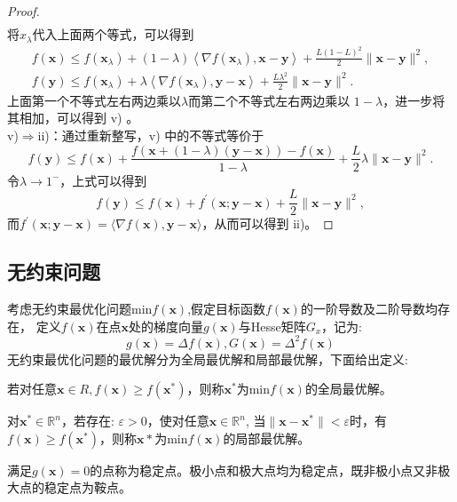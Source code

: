 \begin{proof}
\begin{equation}
\begin{array}{l}
\end{array}
    \nonumber
\end{equation}
将$x_{\lambda}  $代入上面两个等式，可以得到
\begin{equation}
\begin{array}{c}
f(\bm{x}) \leq f\left(\bm{x}_{\lambda}\right)+(1-\lambda)\left\langle\nabla f\left(\bm{x}_{\lambda}\right), \bm{x}-\bm{y}\right\rangle+\frac{L(1-L)^{2}}{2}\|\bm{x}-\bm{y}\|^{2} , \\
f(\bm{y}) \leq f\left(\bm{x}_{\lambda}\right)+\lambda\left\langle\nabla f\left(\bm{x}_{\lambda}\right), \bm{y}-\bm{x}\right\rangle+\frac{L \lambda^{2}}{2}\|\bm{x}-\bm{y}\|^{2} .
\end{array}
    \nonumber
\end{equation}
上面第一个不等式左右两边乘以$  \lambda  $而第二个不等式左右两边乘以  $1-\lambda $，进一步将其相加，可以得到 v)  。\\
v)$ \Rightarrow $ii)：通过重新整写，v) 中的不等式等价于
\begin{equation}
f(\bm{y}) \leq f(\bm{x})+\frac{f(\bm{x}+(1-\lambda)(\bm{y}-\bm{x}))-f(\bm{x})}{1-\lambda}+\frac{L}{2} \lambda\|\bm{x}-\bm{y}\|^{2} .
    \nonumber
\end{equation}
令$  \lambda \rightarrow 1^{-} $，上式可以得到
\begin{equation}
f(\bm{y}) \leq f(\bm{x})+f^{\prime}(\bm{x} ; \bm{y}-\bm{x})+\frac{L}{2}\|\bm{x}-\bm{y}\|^{2},
    \nonumber
\end{equation}
而$  f^{\prime}(\bm{x} ; \bm{y}-\bm{x})=\langle\nabla f(\bm{x}), \bm{y}-\bm{x}\rangle $，从而可以得到 ii)。
\end{proof}

\subsection{无约束问题}
考虑无约束最优化问题min$f(\bm{x})$,假定目标函数$f(\bm{x})$的一阶导数及二阶导数均存在，
定义$f(\bm{x})$在点$\bm{x}$处的梯度向量$g(\bm{x})$与Hesse矩阵$G_x$，记为:
\begin{equation}
    g(\bm{x})=\Delta f(\bm{x}), G(\bm{x})= \Delta^2f(\bm{x})    
\end{equation}
无约束最优化问题的最优解分为全局最优解和局部最优解，下面给出定义:
\begin{definition}[全局最优解]
    若对任意$\bm{x}\in R,f(\bm{x}) \geq f(\bm{x}^{*})$，则称$\bm{x}^*$为min$f(\bm{x})$的全局最优解。
\end{definition}
\begin{definition}[局部最优解]
    对$\bm{x}^*\in\mathbb{R}^{n}$，若存在: $\varepsilon >0$，使对任意$\bm{x} \in\mathbb{R}^{n}$, 
    当$\|\bm{x}-\bm{x}^*\| < \varepsilon$时，有$f(\bm{x}) ≥ f(\bm{x}^*)$，则称$\bm{x}*$为min$f(\bm{x})$的局部最优解。
\end{definition}
\begin{definition}[稳定点]
    满足$g(\bm{x})= 0$的点称为稳定点。极小点和极大点均为稳定点，既非极小点又非极大点的稳定点为鞍点。
\end{definition}

